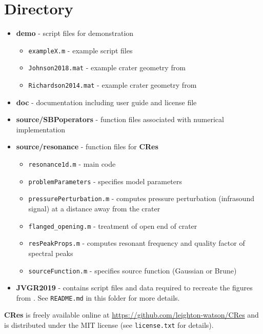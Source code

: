 \documentclass[10pt]{article}
\begin{document}
\section{Directory}
\begin{itemize}
\item {\bf demo} - script files for demonstration
\begin{itemize}
\item \texttt{exampleX.m} - example script files
\item \texttt{Johnson2018.mat} - example crater geometry from \citet{Johnson2018_Villarrica}
\item \texttt{Richardson2014.mat} - example crater geometry from \citet{Richardson2014}
\end{itemize}

\item {\bf doc} - documentation including user guide and license file
\item{\bf source/SBPoperators} - function files associated with numerical implementation
\item {\bf source/resonance} - function files for {\bf CRes}
\begin{itemize}
\item \texttt{resonance1d.m} - main code
\item \texttt{problemParameters} - specifies model parameters
\item \texttt{pressurePerturbation.m} - computes pressure perturbation (infrasound signal) at a distance away from the crater
\item \texttt{flanged\_opening.m} - treatment of open end of crater
\item \texttt{resPeakProps.m} - computes resonant frequency and quality factor of spectral peaks
\item \texttt{sourceFunction.m} - specifies source function (Gaussian or Brune)
\end{itemize}
\item {\bf JVGR2019} - contains script files and data required to recreate the figures from \citet{Watson2019_infrasonic_resonance}. See \texttt{README.md} in this folder for more details.
\end{itemize}

{\bf CRes} is freely available online at \href{https://github.com/leighton-watson/CRes}{https://github.com/leighton-watson/CRes} and is distributed under the MIT license (see \texttt{license.txt} for details). 

\end{document}
